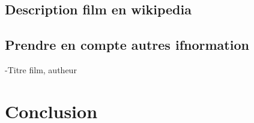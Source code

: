 	\section{Description film en wikipedia}
	\section{Prendre en compte autres ifnormation}
	-Titre film, autheur	
\chapter*{Conclusion}



